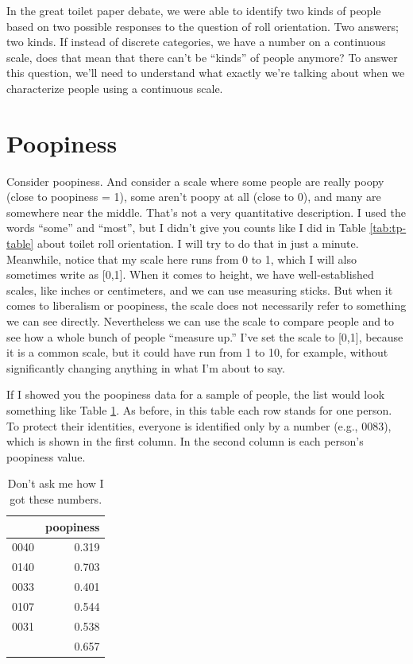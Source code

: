 \documentclass[openany]{book}
\begin{document}
In the great toilet paper debate, we were able to identify two kinds of people based on two possible responses to the question of roll orientation. Two answers; two kinds. If instead of discrete categories, we have a number on a continuous scale, does that mean that there can't be ``kinds'' of people anymore? To answer this question, we'll need to understand what exactly we're talking about when we characterize people using a continuous scale.

\hypertarget{poopiness}{%
\section*{Poopiness}\label{poopiness}}

Consider poopiness. And consider a scale where some people are really poopy (close to poopiness = 1), some aren't poopy at all (close to 0), and many are somewhere near the middle. That's not a very quantitative description. I used the words ``some'' and ``most'', but I didn't give you counts like I did in Table \ref{tab:tp-table} about toilet roll orientation. I will try to do that in just a minute. Meanwhile, notice that my scale here runs from 0 to 1, which I will also sometimes write as {[}0,1{]}. When it comes to height, we have well-established scales, like inches or centimeters, and we can use measuring sticks. But when it comes to liberalism or poopiness, the scale does not necessarily refer to something we can see directly. Nevertheless we can use the scale to compare people and to see how a whole bunch of people ``measure up.'' I've set the scale to {[}0,1{]}, because it is a common scale, but it could have run from 1 to 10, for example, without significantly changing anything in what I'm about to say.

If I showed you the poopiness data for a sample of people, the list would look something like Table \ref{tab:poopy-counts}. As before, in this table each row stands for one person. To protect their identities, everyone is identified only by a number (e.g., 0083), which is shown in the first column. In the second column is each person's poopiness value.

\begin{table}[!h]

\caption{\label{tab:poopy-counts}Don't ask me how I got these numbers.}
\centering
\begin{tabular}[t]{lr}
\toprule
  & poopiness\\
\midrule
0040 & 0.319\\
0140 & 0.703\\
0033 & 0.401\\
0107 & 0.544\\
0031 & 0.538\\
\addlinespace
0100 & 0.657\\
\bottomrule
\end{tabular}
\end{table}
\end{document}

